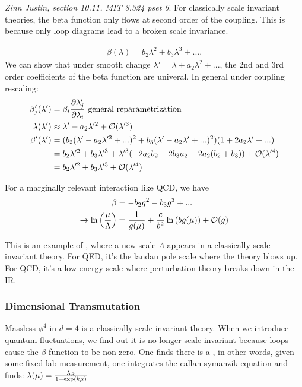 \documentclass[11pt]{scrartcl}
\begin{document}
\emph{Zinn Justin, section 10.11, MIT 8.324 pset 6}.
For classically scale invariant theories, the beta function only flows at second order
of the coupling.  This is because only loop diagrams lead to a broken scale invariance. 

\begin{align}
	\beta(\lambda) = b_2 \lambda^2 + b_3 \lambda^3 + ....
	\end{align}
We can show that under smooth change $\lambda' = \lambda + a_2 \lambda^2 + ...$, the 2nd and 3rd order coefficients of the beta function are univeral.
In general under coupling rescaling:
\begin{align}
	\beta'_j(\lambda') &= \beta_i {\partial \lambda_j' \over \partial \lambda_i} \text{  general reparametrization} \\
	\lambda(\lambda') & \approx \lambda' - a_2 \lambda'^2 + \mathcal{O}(\lambda'^3) \\
	\beta'(\lambda') &= (b_2 (\lambda' - a_2 \lambda'^2 + ...)^2 + b_3 (\lambda' - a_2 \lambda' + ...)^2 ) (1 + 2 a_2 \lambda' + ... ) \\
	& = b_2 \lambda'^2 + b_3 \lambda'^3 + \lambda'^3 (- 2 a_2 b_2 - 2 b_3 a_2 + 2 a_2 (b_2 + b_3)) + \mathcal{O}(\lambda'^4) \\
	&= b_2 \lambda'^2 + b_3 \lambda'^3 + \mathcal{O}(\lambda'^4)
	\end{align}

For a marginally relevant interaction like QCD, we have
\begin{align}
	\beta &= - b_2 g^2 - b_3 g^3  + ... \\
	\rightarrow \ln \left({\mu \over \Lambda} \right) &= {1 \over g(\mu)} + {c \over b^2} \ln \left({b g(\mu)}\right) + \mathcal{O}(g) \\
	\end{align}

This is an example of , where a new scale $\Lambda$ appears in a classically scale invariant theory.
For QED, it's the landau pole scale where the theory blows up. For QCD, it's a low energy scale where perturbation theory breaks down in the IR.

\subsubsection{Dimensional Transmutation}

Massless $\phi^4 $ in $d=4$ is a classically scale invariant theory. When we introduce quantum fluctuations, we find out it is no-longer scale invariant because loops cause the $\beta$ function to be non-zero.  One finds there is a , in other words, given some fixed lab measurement, one integrates the callan symanzik equation and finds:
$\lambda(\mu) = {\lambda_R \over 1 - \exp\left({k \mu}\right)}$
\end{document}
